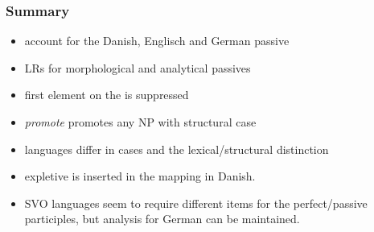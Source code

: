 




\subsubsection{Summary}





\begin{itemize}
\item account for the Danish, Englisch and German passive 

\item LRs for morphological and analytical passives

\item first element on the \argstl is suppressed

\item \emph{promote} promotes any NP with structural case


\item languages differ in cases and the lexical/structural distinction

\item expletive is inserted in the \argst mapping in Danish.


\item SVO languages seem to require different items for the perfect/passive participles, but
  analysis for German can be maintained.


\end{itemize}









